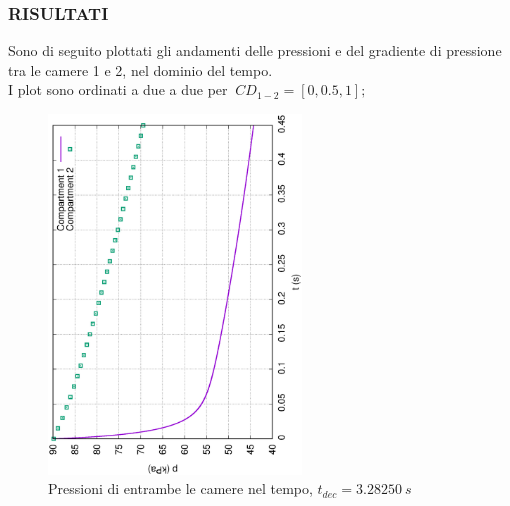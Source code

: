 \documentclass{article}
\begin{document}
        \subsubsection{RISULTATI}
        Sono di seguito plottati gli andamenti delle pressioni e del 
        gradiente di pressione tra le camere 1 e 2, nel dominio del tempo. \\ 
        I plot sono ordinati a due a due per $\ CD_{1-2} = [0, 0.5, 1];$ \

        \begin{figure}[h!]
            \centering
            \label{fig:press_cam_0}
            \includegraphics[width=0.6\textwidth, angle=-90]{MUL2/Esercitazione1/1A/p.eps}
            \caption{Pressioni di entrambe le camere nel tempo, $t_{dec} = 3.28250 \ s$}
        \end{figure}
\end{document}
